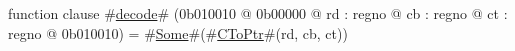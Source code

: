 function clause #\hyperref[zdecode]{decode}# (0b010010 @ 0b00000 @ rd : regno @ cb : regno @ ct : regno @ 0b010010) = #\hyperref[zSome]{Some}#(#\hyperref[zCToPtr]{CToPtr}#(rd, cb, ct))
